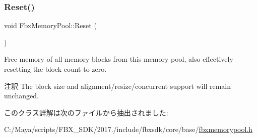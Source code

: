 \subsubsection{\texorpdfstring{Reset()}{Reset()}}
{\footnotesize\ttfamily void Fbx\+Memory\+Pool\+::\+Reset (\begin{DoxyParamCaption}{ }\end{DoxyParamCaption})}

Free memory of all memory blocks from this memory pool, also effectively resetting the block count to zero. \begin{DoxyRemark}{注釈}
The block size and alignment/resize/concurrent support will remain unchanged. 
\end{DoxyRemark}


このクラス詳解は次のファイルから抽出されました\+:\begin{DoxyCompactItemize}
\item 
C\+:/\+Maya/scripts/\+F\+B\+X\+\_\+\+S\+D\+K/2017./include/fbxsdk/core/base/\hyperlink{fbxmemorypool_8h}{fbxmemorypool.\+h}\end{DoxyCompactItemize}
